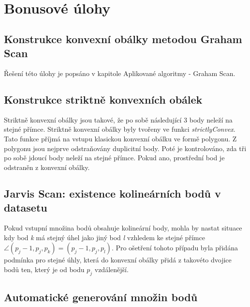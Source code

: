\documentclass[a4paper, 12pt]{article}
\begin{document}
\section{Bonusové úlohy}

\subsection{Konstrukce konvexní obálky metodou Graham Scan}
Řešení této úlohy je popsáno v kapitole Aplikované algoritmy - Graham Scan.

\subsection{Konstrukce striktně konvexních obálek}
Striktně konvexní obálky jsou takové, že po sobě následující 3 body neleží na stejné přímce. Striktně konvexní obálky byly tvořeny ve funkci \textit{strictlyConvex}. Tato funkce příjmá na vstupu klasickou konvexní obálku ve formě polygonu. Z polygonu jsou nejprve odstraňovány duplicitní body. Poté je kontrolováno, zda tři po sobě jdoucí body neleží na stejné přímce. Pokud ano, prostřední bod je odstraněn z konvexní obálky.

\begin{enumerate}
\item $ for(int i=0; i<(ch.size()-2); i++){$
\item $     if(getPointLinePosition(ch[i+2],ch[i],ch[i+1])==-1){$
\item $         ch.remove(i+1);$
\item $         i--;} $
\end{enumerate}

\subsection{Jarvis Scan: existence kolineárních bodů v datasetu}
Pokud vstupní množina bodů obsahuje kolineární body, mohla by nastat situace kdy bod \textit{k} má stejný úhel jako jiný bod \textit{l} vzhledem ke stejné přímce $\angle (p_j-1, p_j, p_k)=(p_j-1, p_j, p_l)$. Pro ošetření tohoto případu byla přidána podmínka pro stejné úhly, která do konvexní obálky přidá z takovéto dvojice bodů ten, který je od bodu $p_j$ vzdálenější. 

\subsection{Automatické generování množin bodů}
\end{document}
